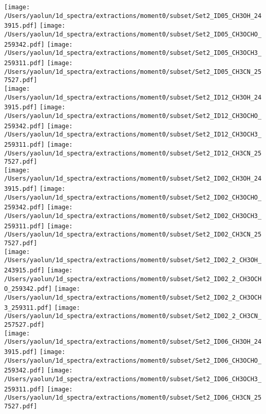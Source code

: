 \addtocounter{figure}{-1}
\begin{figure*}[htbp!]
  \centering
  \texttt{[image: /Users/yaolun/1d\_spectra/extractions/moment0/subset/Set2\_ID05\_CH3OH\_243915.pdf]}
  \texttt{[image: /Users/yaolun/1d\_spectra/extractions/moment0/subset/Set2\_ID05\_CH3OCHO\_259342.pdf]}
  \texttt{[image: /Users/yaolun/1d\_spectra/extractions/moment0/subset/Set2\_ID05\_CH3OCH3\_259311.pdf]}
  \texttt{[image: /Users/yaolun/1d\_spectra/extractions/moment0/subset/Set2\_ID05\_CH3CN\_257527.pdf]}
  \\
  \texttt{[image: /Users/yaolun/1d\_spectra/extractions/moment0/subset/Set2\_ID12\_CH3OH\_243915.pdf]}
  \texttt{[image: /Users/yaolun/1d\_spectra/extractions/moment0/subset/Set2\_ID12\_CH3OCHO\_259342.pdf]}
  \texttt{[image: /Users/yaolun/1d\_spectra/extractions/moment0/subset/Set2\_ID12\_CH3OCH3\_259311.pdf]}
  \texttt{[image: /Users/yaolun/1d\_spectra/extractions/moment0/subset/Set2\_ID12\_CH3CN\_257527.pdf]}
  \\
  \texttt{[image: /Users/yaolun/1d\_spectra/extractions/moment0/subset/Set2\_ID02\_CH3OH\_243915.pdf]}
  \texttt{[image: /Users/yaolun/1d\_spectra/extractions/moment0/subset/Set2\_ID02\_CH3OCHO\_259342.pdf]}
  \texttt{[image: /Users/yaolun/1d\_spectra/extractions/moment0/subset/Set2\_ID02\_CH3OCH3\_259311.pdf]}
  \texttt{[image: /Users/yaolun/1d\_spectra/extractions/moment0/subset/Set2\_ID02\_CH3CN\_257527.pdf]}
  \\
  \texttt{[image: /Users/yaolun/1d\_spectra/extractions/moment0/subset/Set2\_ID02\_2\_CH3OH\_243915.pdf]}
  \texttt{[image: /Users/yaolun/1d\_spectra/extractions/moment0/subset/Set2\_ID02\_2\_CH3OCHO\_259342.pdf]}
  \texttt{[image: /Users/yaolun/1d\_spectra/extractions/moment0/subset/Set2\_ID02\_2\_CH3OCH3\_259311.pdf]}
  \texttt{[image: /Users/yaolun/1d\_spectra/extractions/moment0/subset/Set2\_ID02\_2\_CH3CN\_257527.pdf]}
  \\
  \texttt{[image: /Users/yaolun/1d\_spectra/extractions/moment0/subset/Set2\_ID06\_CH3OH\_243915.pdf]}
  \texttt{[image: /Users/yaolun/1d\_spectra/extractions/moment0/subset/Set2\_ID06\_CH3OCHO\_259342.pdf]}
  \texttt{[image: /Users/yaolun/1d\_spectra/extractions/moment0/subset/Set2\_ID06\_CH3OCH3\_259311.pdf]}
  \texttt{[image: /Users/yaolun/1d\_spectra/extractions/moment0/subset/Set2\_ID06\_CH3CN\_257527.pdf]}
  \\
  \caption{}
\end{figure*}
